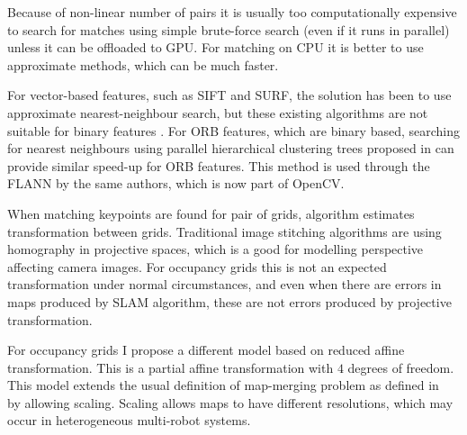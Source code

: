 Because of non-linear number of pairs it is usually too computationally expensive to search for matches using simple brute-force search (even if it runs in parallel) unless it can be offloaded to GPU. For matching on CPU it is better to use approximate methods, which can be much faster.

For vector-based features, such as \gls{SIFT} and \gls{SURF}, the solution has been to use approximate nearest-neighbour search, but these existing algorithms are not suitable for binary features \cite{Muja2012}. For \gls{ORB} features, which are binary based, searching for nearest neighbours using parallel hierarchical clustering trees proposed in \cite{Muja2012} can provide similar speed-up for \gls{ORB} features. This method is used through the \gls{FLANN} by the same authors, which is now part of \gls{OpenCV}.

When matching keypoints are found for pair of grids, algorithm estimates transformation between grids. Traditional image stitching algorithms are using homography in projective spaces, which is a good for modelling perspective affecting camera images. For occupancy grids this is not an expected transformation under normal circumstances, and even when there are errors in maps produced by \gls{SLAM} algorithm, these are not errors produced by projective transformation.

For occupancy grids I propose a different model based on reduced affine transformation. This is a partial affine transformation with $4$ degrees of freedom. This model extends the usual definition of map-merging problem as defined in~\cite{Lee2012} by allowing scaling. Scaling allows maps to have different resolutions, which may occur in heterogeneous multi-robot systems.

